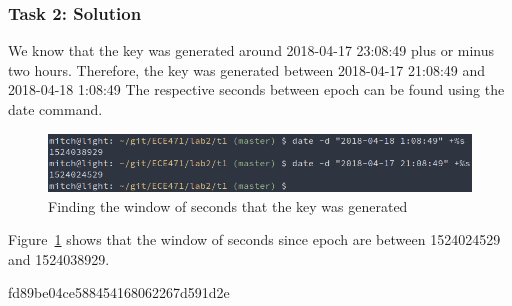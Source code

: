 \documentclass[12pt]{article}
\begin{document}
\subsubsection{Task 2: Solution}


We know that the key was generated around 2018-04-17 23:08:49 plus or minus two hours. Therefore, the key was generated between 2018-04-17 21:08:49 and 2018-04-18 1:08:49 The respective seconds between epoch can be found using the date command.

\begin{figure}[H]
    \begin{center}
        \includegraphics[scale=0.6]{t2p0.png}
    \end{center}{}
    \caption{Finding the window of seconds that the key was generated}
    \label{fig:t2p0}
\end{figure}

Figure~\ref{fig:t2p0} shows that the window of seconds since epoch are between 1524024529 and 1524038929.


fd89be04ce588454168062267d591d2e
\end{document}
